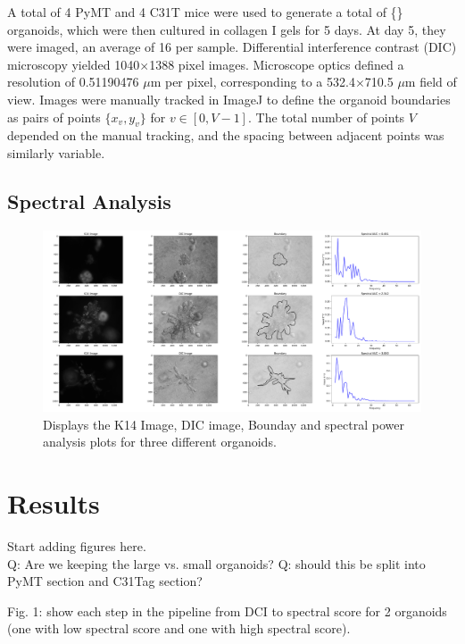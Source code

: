 \documentclass[runningheads]{llncs}
\begin{document}
 A total of 4 PyMT and 4 C31T mice were used to generate a total of \{\} organoids, which were then cultured in collagen I gels for 5 days. At day 5, they were imaged, an average of 16 per sample. Differential interference contrast (DIC) microscopy yielded 1040$\times$1388 pixel images. Microscope optics defined a resolution of 0.51190476 $\mu$m per pixel, corresponding to a 532.4$\times$710.5 $\mu$m field of view. Images were manually tracked in {\sc ImageJ} \cite{Schneider:2012ui} to define the organoid boundaries as pairs of points $\{x_v,y_v\}$ for $v \in [0,V-1]$. The total number of points $V$ depended on the manual tracking, and the spacing between adjacent points was similarly variable.

\subsection{Spectral Analysis}
\begin{figure}
\includegraphics[width=\textwidth]{Image1.pdf}
\caption{Displays the K14 Image, DIC image, Bounday and spectral power analysis plots for three different organoids.} \label{fig1}
\end{figure}

\subsubsection{}

\section{Results}

Start adding figures here.\\
Q: Are we keeping the large vs. small organoids?
Q: should this be split into PyMT section and C31Tag section?

Fig. 1: show each step in the pipeline from DCI to spectral score for 2 organoids (one with low spectral score and one with high spectral score).
\end{document}
